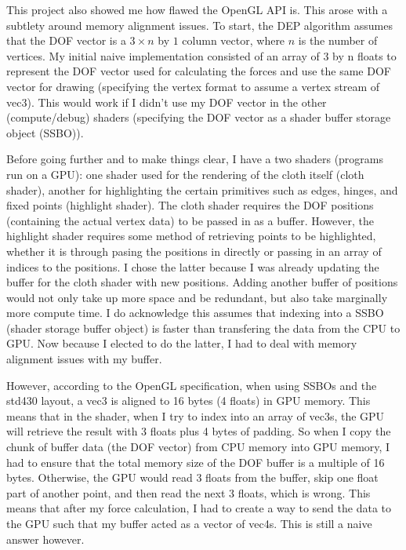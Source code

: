 \documentclass[letterpaper, 10 pt, conference]{ieeeconf}  %
\begin{document}
        This project also showed me how flawed the OpenGL API is. This arose with a subtlety around memory alignment issues. To start, the DEP algorithm assumes that the DOF vector is a $ 3 \times n $ by $ 1 $ column vector, where $n$ is the number of vertices. My initial naive implementation consisted of an array of 3 by n floats to represent the DOF vector used for calculating the forces and use the same DOF vector for drawing (specifying the vertex format to assume a vertex stream of vec3). This would work if I didn't use my DOF vector in the other (compute/debug) shaders (specifying the DOF vector as a shader buffer storage object (SSBO)).

        Before going further and to make things clear, I have a two shaders (programs run on a GPU): one shader used for the rendering of the cloth itself (cloth shader), another for highlighting the certain primitives such as edges, hinges, and fixed points (highlight shader). The cloth shader requires the DOF positions (containing the actual vertex data) to be passed in as a buffer. However, the highlight shader requires some method of retrieving points to be highlighted, whether it is through pasing the positions in directly or passing in an array of indices to the positions. I chose the latter because I was already updating the buffer for the cloth shader with new positions. Adding another buffer of positions would not only take up more space and be redundant, but also take marginally more compute time. I do acknowledge this assumes that indexing into a SSBO (shader storage buffer object) is faster than transfering the data from the CPU to GPU. Now because I elected to do the latter, I had to deal with memory alignment issues with my buffer. 

        However, according to the OpenGL specification, when using SSBOs and the std430 layout, a vec3 is aligned to 16 bytes (4 floats) in GPU memory. This means that in the shader, when I try to index into an array of vec3s, the GPU will retrieve the result with 3 floats plus 4 bytes of padding. So when I copy the chunk of buffer data (the DOF vector) from CPU memory into GPU memory, I had to ensure that the total memory size of the DOF buffer is a multiple of 16 bytes. Otherwise, the GPU would read 3 floats from the buffer, skip one float part of another point, and then read the next 3 floats, which is wrong. This means that after my force calculation, I had to create a way to send the data to the GPU such that my buffer acted as a vector of vec4s. This is still a naive answer however. 
\end{document}
